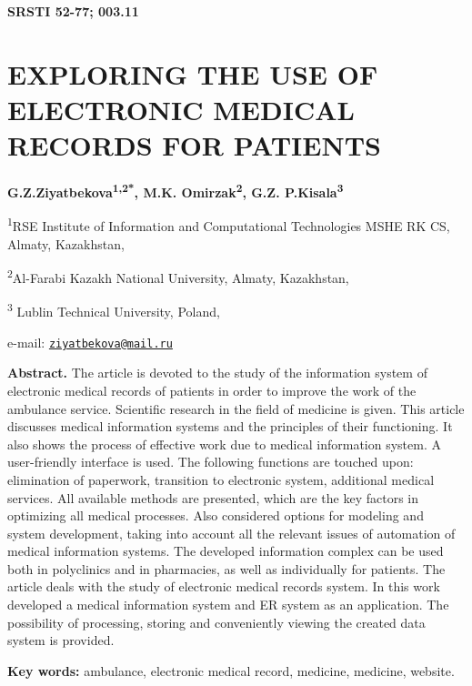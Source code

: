 \clearpage
{\bfseries SRSTI 52-77; 003.11}

\section{EXPLORING THE USE OF ELECTRONIC MEDICAL RECORDS FOR PATIENTS}
\begin{center}
{\bfseries G.Z.Ziyatbekova\textsuperscript{1,2*}, M.K.
Omirzak\textsuperscript{2}, G.Z. P.Kisala\textsuperscript{3}}

\textsuperscript{1}RSE Institute of Information and Computational
Technologies MSHE RK CS, Almaty, Kazakhstan,

\textsuperscript{2}Al-Farabi Kazakh National University, Almaty,
Kazakhstan,

\textsuperscript{3} Lublin Technical University,
Poland,

e-mail:
\href{mailto:ziyatbekova@mail.ru}{\nolinkurl{ziyatbekova@mail.ru}}
\end{center}

{\bfseries Abstract.} The article is devoted to the study of the
information system of electronic medical records of patients in order to
improve the work of the ambulance service. Scientific research in the
field of medicine is given. This article discusses medical information
systems and the principles of their functioning. It also shows the
process of effective work due to medical information system. A
user-friendly interface is used. The following functions are touched
upon: elimination of paperwork, transition to electronic system,
additional medical services. All available methods are presented, which
are the key factors in optimizing all medical processes. Also considered
options for modeling and system development, taking into account all the
relevant issues of automation of medical information systems. The
developed information complex can be used both in polyclinics and in
pharmacies, as well as individually for patients. The article deals with
the study of electronic medical records system. In this work developed a
medical information system and ER system as an application. The
possibility of processing, storing and conveniently viewing the created
data system is provided.

{\bfseries Key words:} ambulance, electronic medical record, medicine,
medicine, website.

